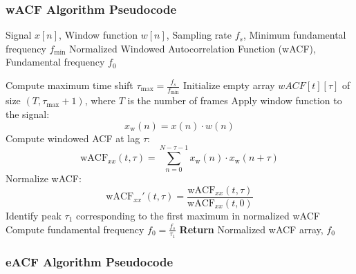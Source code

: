 \documentclass{ieeeaccess}
\begin{document}
\subsubsection{wACF Algorithm Pseudocode}
\begin{algorithmic}[1]
\vspace{5pt} \hline \vspace{5pt}
\REQUIRE Signal $x[n]$, Window function $w[n]$, Sampling rate $f_s$, Minimum fundamental frequency $f_{\text{min}}$
\vspace{5pt} \hline \vspace{5pt}
\ENSURE Normalized Windowed Autocorrelation Function (wACF), Fundamental frequency $f_0$

\STATE Compute maximum time shift $\tau_{\text{max}} = \frac{f_s}{f_{\text{min}}}$
\STATE Initialize empty array $wACF[t][\tau]$ of size $(T, \tau_{\text{max}} + 1)$, where $T$ is the number of frames
    \STATE Apply window function to the signal: 
           \[
           x_{\text{w}}(n) = x(n) \cdot w(n)
           \]
        \STATE Compute windowed ACF at lag $\tau$: 
               \[
               \text{wACF}_{xx}(t, \tau) = \sum_{n=0}^{N-\tau-1} x_{\text{w}}(n)\cdot x_{\text{w}}(n+\tau)
               \]
    \ENDFOR
\ENDFOR
\STATE Normalize wACF:
           \[
           \text{wACF}_{xx}'(t, \tau) = \frac{\text{wACF}_{xx}(t, \tau)}{\text{wACF}_{xx}(t, 0)}
           \]
\STATE Identify peak $\tau_1$ corresponding to the first maximum in normalized wACF
\STATE Compute fundamental frequency $f_0 = \frac{f_s}{\tau_1}$
\STATE \textbf{Return} Normalized wACF array, $f_0$
\vspace{5pt} \hline \vspace{5pt}
\end{algorithmic}

\subsubsection{eACF Algorithm Pseudocode}
\end{document}
